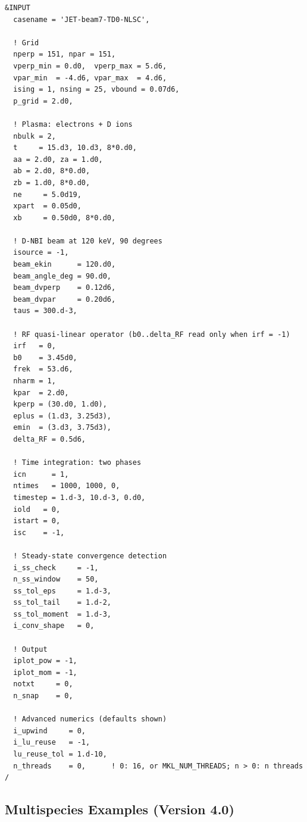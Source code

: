 \documentclass[11pt,a4paper]{article}
\begin{document}
\begin{lstlisting}
&INPUT
  casename = 'JET-beam7-TD0-NLSC',

  ! Grid
  nperp = 151, npar = 151,
  vperp_min = 0.d0,  vperp_max = 5.d6,
  vpar_min  = -4.d6, vpar_max  = 4.d6,
  ising = 1, nsing = 25, vbound = 0.07d6,
  p_grid = 2.d0,

  ! Plasma: electrons + D ions
  nbulk = 2,
  t     = 15.d3, 10.d3, 8*0.d0,
  aa = 2.d0, za = 1.d0,
  ab = 2.d0, 8*0.d0,
  zb = 1.d0, 8*0.d0,
  ne     = 5.0d19,
  xpart  = 0.05d0,
  xb     = 0.50d0, 8*0.d0,

  ! D-NBI beam at 120 keV, 90 degrees
  isource = -1,
  beam_ekin      = 120.d0,
  beam_angle_deg = 90.d0,
  beam_dvperp    = 0.12d6,
  beam_dvpar     = 0.20d6,
  taus = 300.d-3,

  ! RF quasi-linear operator (b0..delta_RF read only when irf = -1)
  irf   = 0,
  b0    = 3.45d0,
  frek  = 53.d6,
  nharm = 1,
  kpar  = 2.d0,
  kperp = (30.d0, 1.d0),
  eplus = (1.d3, 3.25d3),
  emin  = (3.d3, 3.75d3),
  delta_RF = 0.5d6,

  ! Time integration: two phases
  icn      = 1,
  ntimes   = 1000, 1000, 0,
  timestep = 1.d-3, 10.d-3, 0.d0,
  iold   = 0,
  istart = 0,
  isc    = -1,

  ! Steady-state convergence detection
  i_ss_check     = -1,
  n_ss_window    = 50,
  ss_tol_eps     = 1.d-3,
  ss_tol_tail    = 1.d-2,
  ss_tol_moment  = 1.d-3,
  i_conv_shape   = 0,

  ! Output
  iplot_pow = -1,
  iplot_mom = -1,
  notxt     = 0,
  n_snap    = 0,

  ! Advanced numerics (defaults shown)
  i_upwind     = 0,
  i_lu_reuse   = -1,
  lu_reuse_tol = 1.d-10,
  n_threads    = 0,      ! 0: 16, or MKL_NUM_THREADS; n > 0: n threads
/
\end{lstlisting}


\subsection{Multispecies Examples (Version 4.0)}
\end{document}
